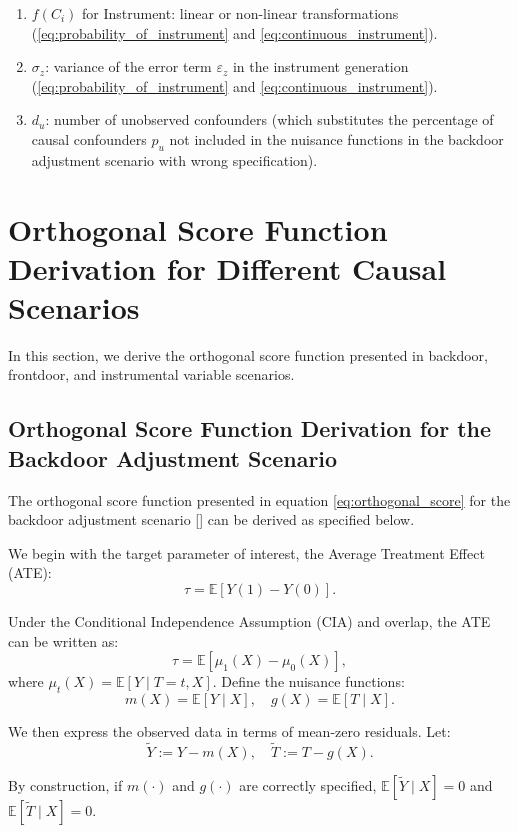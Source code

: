 \documentclass{article}
\numberwithin{equation}{section}
\begin{document}
\begin{enumerate}[label=\roman*.]
    \item $f(C_i)$ for Instrument: linear or non-linear transformations (\ref{eq:probability_of_instrument} and \ref{eq:continuous_instrument}).
    \item $\sigma_z$: variance of the error term $\varepsilon_z$ in the instrument generation (\ref{eq:probability_of_instrument} and \ref{eq:continuous_instrument}).
    \item $d_u$: number of unobserved confounders (which substitutes the percentage of causal confounders $p_u$ not included in the nuisance functions in the backdoor adjustment scenario with wrong specification).
\end{enumerate}

\section{Orthogonal Score Function Derivation for Different Causal Scenarios}

In this section, we derive the orthogonal score function presented in backdoor, frontdoor, and instrumental variable scenarios.

\subsection{Orthogonal Score Function Derivation for the Backdoor Adjustment Scenario}
\label{subsec:appendix_orthogonal_score_function_backdoor_adjustment}

The orthogonal score function presented in equation \eqref{eq:orthogonal_score} for the backdoor adjustment scenario [\cite{ChernozhukovChetverikovDemireretal2018, Pearl2009}] can be derived as specified below.

We begin with the target parameter of interest, the Average Treatment Effect (ATE):
\[
\tau = \mathbb{E}[Y(1) - Y(0)].
\]

Under the Conditional Independence Assumption (CIA) and overlap, the ATE can be written as:
\[
\tau = \mathbb{E}[\mu_1(X) - \mu_0(X)],
\]
where \(\mu_t(X) = \mathbb{E}[Y \mid T=t,X]\). Define the nuisance functions:
\[
m(X) = \mathbb{E}[Y \mid X], \quad g(X) = \mathbb{E}[T \mid X].
\]

We then express the observed data in terms of mean-zero residuals. Let:
\[
\tilde{Y} := Y - m(X), \quad \tilde{T} := T - g(X).
\]

By construction, if \(m(\cdot)\) and \(g(\cdot)\) are correctly specified, \(\mathbb{E}[\tilde{Y} \mid X] = 0\) and \(\mathbb{E}[\tilde{T} \mid X] = 0\).
\end{document}
